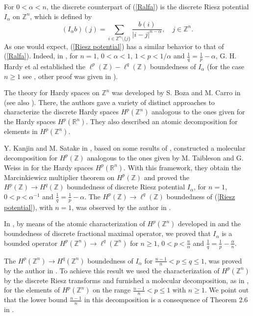 \documentclass[leqno,12pt]{article} %
\theoremstyle{plain} %
\theoremstyle{definition} %
\begin{document}
For $0 < \alpha < n$, the discrete counterpart of (\ref{Ralfa}) is the discrete Riesz potential $I_{\alpha}$ on $\mathbb{Z}^n$, which is 
defined by
\begin{equation} \label{Riesz potential}
(I_{\alpha}b)(j) = \sum_{i \in \mathbb{Z}^n \setminus \{ j \}} \frac{b(i)}{|i-j |^{n - \alpha}}, \,\,\,\,\,\, j \in \mathbb{Z}^n.
\end{equation}
As one would expect, (\ref{Riesz potential}) has a similar behavior to that of (\ref{Ralfa}). Indeed, in \cite[p. 288]{Hardy}, for $n=1$, 
$0 < \alpha < 1$, $1 < p < 1/\alpha$ and $\frac{1}{q} = \frac{1}{p} - \alpha$, G. H. Hardy et al established the $\ell^p(\mathbb{Z}) - \ell^q(\mathbb{Z})$ boundedness of $I_{\alpha}$ (for the case $n \geq 1$ see \cite[Proposition $(a)$]{Wainger}, other proof was given in \cite[Theorem 3.1]{PRocha}).

The theory for Hardy spaces on $\mathbb{Z}^n$ was developed by S. Boza and M. Carro in \cite{Carro} (see also \cite{Boza}). There, the authors
gave a variety of distinct approaches to characterize the discrete Hardy spaces $H^p(\mathbb{Z}^n)$ analogous to the ones given for the Hardy spaces $H^p(\mathbb{R}^n)$. They also described an atomic decomposition for elements in $H^p(\mathbb{Z}^n)$.

Y. Kanjin and M. Satake in \cite{Kanjin}, based on some results of \cite{Boza}, constructed a molecular decomposition for 
$H^p(\mathbb{Z})$ analogous to the ones given by M. Taibleson and G. Weiss in \cite{Taible} for the Hardy spaces $H^p(\mathbb{R}^n)$. With this framework, they obtain the Marcinkiewicz multiplier theorem on $H^p(\mathbb{Z})$ and proved the $H^p(\mathbb{Z}) \to H^q(\mathbb{Z})$ boundedness of discrete Riesz potential $I_{\alpha}$, for $n=1$, $0 < p < \alpha^{-1}$ and $\frac{1}{q} = \frac{1}{p} - \alpha$. The 
$H^{p}(\mathbb{Z}) \to \ell^{q}(\mathbb{Z})$ boundedness of (\ref{Riesz potential}), with $n=1$, was observed by the author in 
\cite[Remark 11]{Rocha}. 

In \cite{PRocha}, by means of the atomic characterization of $H^p(\mathbb{Z}^n)$ developed in \cite{Carro} and the boundedness of discrete fractional maximal operator, we proved that $I_{\alpha}$ is a bounded operator $H^{p}(\mathbb{Z}^n) \to \ell^{q}(\mathbb{Z}^n)$ for $n \geq 1$,
$0 < p < \frac{n}{\alpha}$ and $\frac{1}{q} = \frac{1}{p} - \frac{\alpha}{n}$. 

The $H^p(\mathbb{Z}^n) \to H^q(\mathbb{Z}^n)$ boundedness of $I_{\alpha}$ for $\frac{n-1}{n} < p \leq q \leq 1$, was proved by the author in \cite{Rocha2}. To achieve this result we used the characterization of $H^p(\mathbb{Z}^n)$ by the discrete Riesz transforms and furnished 
a molecular decomposition, as in \cite{Kanjin}, for the elements of $H^{p}(\mathbb{Z}^n)$ on the range $\frac{n-1}{n} < p \leq 1$ with 
$n \geq 1$. We point out that the lower bound $\frac{n-1}{n}$ in this decomposition is a consequence of Theorem 2.6 in \cite{Carro}.
\end{document}
